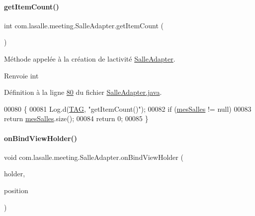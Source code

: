 \paragraph{\texorpdfstring{get\+Item\+Count()}{getItemCount()}}
{\footnotesize\ttfamily int com.\+lasalle.\+meeting.\+Salle\+Adapter.\+get\+Item\+Count (\begin{DoxyParamCaption}{ }\end{DoxyParamCaption})}



Méthode appelée à la création de l\textquotesingle{}activité \hyperlink{classcom_1_1lasalle_1_1meeting_1_1_salle_adapter}{Salle\+Adapter}. 

\begin{DoxyReturn}{Renvoie}
int 
\end{DoxyReturn}


Définition à la ligne \hyperlink{_salle_adapter_8java_source_l00080}{80} du fichier \hyperlink{_salle_adapter_8java_source}{Salle\+Adapter.\+java}.


\begin{DoxyCode}
00080                               \{
00081         Log.d(\hyperlink{classcom_1_1lasalle_1_1meeting_1_1_salle_adapter_a774947591a1beedaffd58989783206b1}{TAG}, \textcolor{stringliteral}{"getItemCount()"});
00082         \textcolor{keywordflow}{if} (\hyperlink{classcom_1_1lasalle_1_1meeting_1_1_salle_adapter_a3988ff211fbf3052b553d77ba0711a5a}{mesSalles} != null)
00083             \textcolor{keywordflow}{return} \hyperlink{classcom_1_1lasalle_1_1meeting_1_1_salle_adapter_a3988ff211fbf3052b553d77ba0711a5a}{mesSalles}.size();
00084         \textcolor{keywordflow}{return} 0;
00085     \}
\end{DoxyCode}
\mbox{\label{classcom_1_1lasalle_1_1meeting_1_1_salle_adapter_ac196b478a0ea01a05455bfe15111406f}} 
\paragraph{\texorpdfstring{on\+Bind\+View\+Holder()}{onBindViewHolder()}}
{\footnotesize\ttfamily void com.\+lasalle.\+meeting.\+Salle\+Adapter.\+on\+Bind\+View\+Holder (\begin{DoxyParamCaption}\item[{@Non\+Null \hyperlink{classcom_1_1lasalle_1_1meeting_1_1_salle_view_holder}{Salle\+View\+Holder}}]{holder,  }\item[{int}]{position }\end{DoxyParamCaption})}



